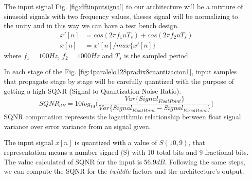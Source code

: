 \documentclass[journal,comsoc]{IEEEtran}
\begin{document}
The input signal Fig. \ref{fig:dftinputsignal} to our architecture will be a mixture of sinusoid signals with two frequency values, theses signal will be normalizing to the unity and in this way we can have a test bench design.
\begin{align}\label{eq: inputSignal}
x'[n] &= cos(2\pi f_1 n T_s) + cos(2\pi f_2 n T_s)  \\
x[n] &= x'[n]/max\{x'[n]\} 						\nonumber
\end{align}
where $f_1=100Hz$, $f_2=1000Hz$ and $T_s$ is the sampled period.

In each stage of the Fig. \ref{fig:4paralelo128pradix8cuantizacion1}, input samples that propagate stage by stage will be carefully quantized with the purpose of getting a high SQNR (Signal to Quantization Noise Ratio).
\begin{equation*}%
SQNR_{dB} = 10log_{10} \bigg(  \frac{  Var\{Signal_{FloatPoint}\}  }{  Var\{Signal_{FloatPoint} - Signal_{FixedPoint}\}}  \bigg)
\end{equation*}
SQNR computation represents the logarithmic relationship between float signal variance over error variance from an signal given.

The input signal $x[n]$ is quantized with a value of $S(10,9)$, that representation means a number signed (S) with $10$ total bits and $9$ fractional bits. The value calculated of SQNR for the input is $56.9dB$. Following the same steps, we can compute the SQNR for the \textit{twiddle} factors and the architecture's output.
\end{document}
